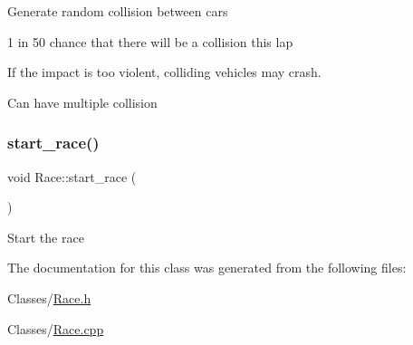 Generate random collision between cars

1 in 50 chance that there will be a collision this lap

If the impact is too violent, colliding vehicles may crash.

Can have multiple collision \mbox{\label{class_race_a4689c08e7e82f81bbd5f2173cf80f2e2}} 
\subsubsection{\texorpdfstring{start\+\_\+race()}{start\_race()}}
{\footnotesize\ttfamily void Race\+::start\+\_\+race (\begin{DoxyParamCaption}{ }\end{DoxyParamCaption})\hspace{0.3cm}{\ttfamily [static]}}

Start the race 

The documentation for this class was generated from the following files\+:\begin{DoxyCompactItemize}
\item 
Classes/\hyperlink{_race_8h}{Race.\+h}\item 
Classes/\hyperlink{_race_8cpp}{Race.\+cpp}\end{DoxyCompactItemize}
